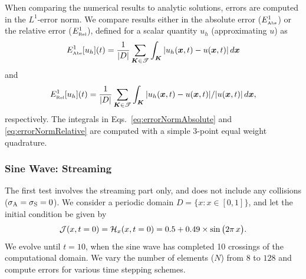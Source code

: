When comparing the numerical results to analytic solutions, errors are computed in the $L^{1}$-error norm.  
We compare results either in the absolute error ($E_{\mbox{\tiny Abs}}^{1}$) or the relative error ($E_{\mbox{\tiny Rel}}^{1}$), defined for a scalar quantity $u_{h}$ (approximating $u$) as
\begin{equation}
  E_{\mbox{\tiny Abs}}^{1}[u_{h}](t)
  =\frac{1}{|D|}\sum_{\boldsymbol{K}\in\mathscr{T}}\int_{\boldsymbol{K}}|u_{h}(\boldsymbol{x},t)-u(\boldsymbol{x},t)|\,d\boldsymbol{x}
  \label{eq:errorNormAbsolute}
\end{equation}
and
\begin{equation}
  E_{\mbox{\tiny Rel}}^{1}[u_{h}](t)
  =\frac{1}{|D|}\sum_{\boldsymbol{K}\in\mathscr{T}}\int_{\boldsymbol{K}}|u_{h}(\boldsymbol{x},t)-u(\boldsymbol{x},t)|/|u(\boldsymbol{x},t)|\,d\boldsymbol{x},
  \label{eq:errorNormRelative}
\end{equation}
respectively.  
The integrals in Eqs.~\eqref{eq:errorNormAbsolute} and \eqref{eq:errorNormRelative} are computed with a simple $3$-point equal weight quadrature.  

\subsubsection{Sine Wave: Streaming}

The first test involves the streaming part only, and does not include any collisions ($\sigma_{{\rm A}}=\sigma_{{\rm S}}=0$).  
We consider a periodic domain $D=\{x:x\in[0,1]\}$, and let the initial condition be given by
\begin{equation}
  \mathcal{J}(x,t=0)=\mathcal{H}_{x}(x,t=0)=0.5+0.49\times\sin\big(2\pi\,x\big).  
  \label{eq:initialConditionStreaming}
\end{equation}
We evolve until $t=10$, when the sine wave has completed 10 crossings of the computational domain.  
We vary the number of elements ($N$) from $8$ to $128$ and compute errors for various time stepping schemes.  

